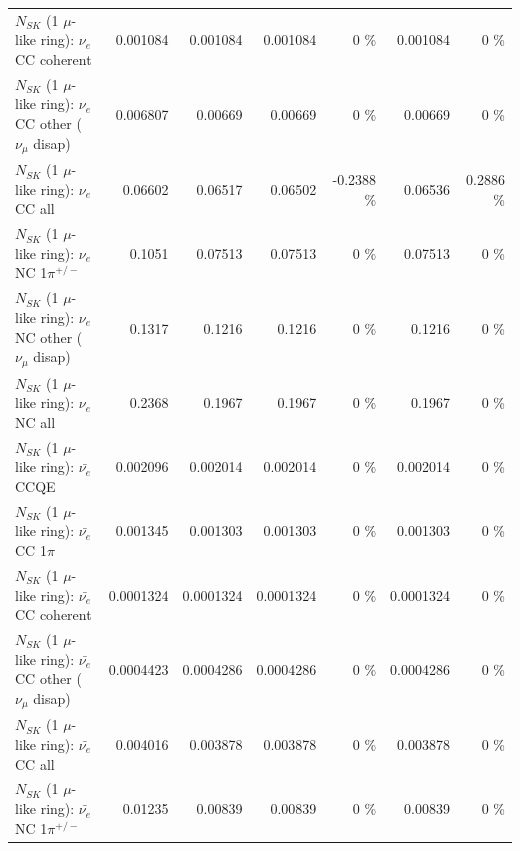 \begin{table}
\begin{tabular}{| l | r | r | r  r | r  r |}
                               $N_{SK}$ (1 $\mu$-like ring): $\nu_e$ CC coherent &        0.001084 &        0.001084 &        0.001084 &        0 \%  &        0.001084 &        0 \%  \\ 
                $N_{SK}$ (1 $\mu$-like ring): $\nu_e$ CC other ($\nu_\mu$ disap) &        0.006807 &         0.00669 &         0.00669 &        0 \%  &         0.00669 &        0 \%  \\ 
                                  $N_{SK}$ (1 $\mu$-like ring): $\nu_{e}$ CC all &         0.06602 &         0.06517 &         0.06502 &  -0.2388 \%  &         0.06536 &   0.2886 \%  \\ 
\hline
                           $N_{SK}$ (1 $\mu$-like ring): $\nu_e$ NC 1$\pi^{+/-}$ &          0.1051 &         0.07513 &         0.07513 &        0 \%  &         0.07513 &        0 \%  \\ 
                $N_{SK}$ (1 $\mu$-like ring): $\nu_e$ NC other ($\nu_\mu$ disap) &          0.1317 &          0.1216 &          0.1216 &        0 \%  &          0.1216 &        0 \%  \\ 
                                  $N_{SK}$ (1 $\mu$-like ring): $\nu_{e}$ NC all &          0.2368 &          0.1967 &          0.1967 &        0 \%  &          0.1967 &        0 \%  \\ 
\hline
\hline
\hline
                                $N_{SK}$ (1 $\mu$-like ring): $\bar{\nu_e}$ CCQE &        0.002096 &        0.002014 &        0.002014 &        0 \%  &        0.002014 &        0 \%  \\ 
                           $N_{SK}$ (1 $\mu$-like ring): $\bar{\nu_e}$ CC 1$\pi$ &        0.001345 &        0.001303 &        0.001303 &        0 \%  &        0.001303 &        0 \%  \\ 
                         $N_{SK}$ (1 $\mu$-like ring): $\bar{\nu_e}$ CC coherent &       0.0001324 &       0.0001324 &       0.0001324 &        0 \%  &       0.0001324 &        0 \%  \\ 
          $N_{SK}$ (1 $\mu$-like ring): $\bar{\nu_e}$ CC other ($\nu_\mu$ disap) &       0.0004423 &       0.0004286 &       0.0004286 &        0 \%  &       0.0004286 &        0 \%  \\ 
                            $N_{SK}$ (1 $\mu$-like ring): $\bar{\nu_{e}}$ CC all &        0.004016 &        0.003878 &        0.003878 &        0 \%  &        0.003878 &        0 \%  \\ 
\hline
                     $N_{SK}$ (1 $\mu$-like ring): $\bar{\nu_e}$ NC 1$\pi^{+/-}$ &         0.01235 &         0.00839 &         0.00839 &        0 \%  &         0.00839 &        0 \%  \\ 

\end{tabular}
\end{table}
